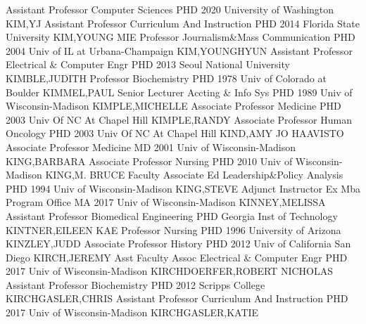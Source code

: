 \documentclass[
]{article}
\begin{document}
\textbar Assistant Professor \textbar Computer Sciences \textbar PHD
2020 University of Washington \textbar KIM,YJ \textbar{} 
\textbar Assistant Professor \textbar Curriculum And Instruction
\textbar PHD 2014 Florida State University \textbar KIM,YOUNG MIE
\textbar{}  \textbar Professor \textbar Journalism\&Mass
Communication \textbar PHD 2004 Univ of IL at Urbana-Champaign
\textbar KIM,YOUNGHYUN \textbar{}  \textbar Assistant
Professor \textbar Electrical \& Computer Engr \textbar PHD 2013 Seoul
National University \textbar KIMBLE,JUDITH \textbar{} 
\textbar Professor \textbar Biochemistry \textbar PHD 1978 Univ of
Colorado at Boulder \textbar KIMMEL,PAUL \textbar{} 
\textbar Senior Lecturer \textbar Accting \& Info Sys \textbar PHD 1989
Univ of Wisconsin-Madison \textbar KIMPLE,MICHELLE \textbar{}
 \textbar Associate Professor \textbar Medicine \textbar PHD
2003 Univ Of NC At Chapel Hill \textbar KIMPLE,RANDY \textbar{}
 \textbar Associate Professor \textbar Human Oncology
\textbar PHD 2003 Univ Of NC At Chapel Hill \textbar KIND,AMY JO
HAAVISTO \textbar{}  \textbar Associate Professor
\textbar Medicine \textbar MD 2001 Univ of Wisconsin-Madison
\textbar KING,BARBARA \textbar{}  \textbar Associate
Professor \textbar Nursing \textbar PHD 2010 Univ of Wisconsin-Madison
\textbar KING,M. BRUCE \textbar{}  \textbar Faculty
Associate \textbar Ed Leadership\&Policy Analysis \textbar PHD 1994 Univ
of Wisconsin-Madison \textbar KING,STEVE \textbar{} 
\textbar Adjunct Instructor \textbar Ex Mba Program Office \textbar MA
2017 Univ of Wisconsin-Madison \textbar KINNEY,MELISSA \textbar{}
 \textbar Assistant Professor \textbar Biomedical
Engineering \textbar PHD Georgia Inst of Technology
\textbar KINTNER,EILEEN KAE \textbar{}  \textbar Professor
\textbar Nursing \textbar PHD 1996 University of Arizona
\textbar KINZLEY,JUDD \textbar{}  \textbar Associate
Professor \textbar History \textbar PHD 2012 Univ of California San
Diego \textbar KIRCH,JEREMY \textbar{}  \textbar Asst
Faculty Assoc \textbar Electrical \& Computer Engr \textbar PHD 2017
Univ of Wisconsin-Madison \textbar KIRCHDOERFER,ROBERT NICHOLAS
\textbar{}  \textbar Assistant Professor
\textbar Biochemistry \textbar PHD 2012 Scripps College
\textbar KIRCHGASLER,CHRIS \textbar{}  \textbar Assistant
Professor \textbar Curriculum And Instruction \textbar PHD 2017 Univ of
Wisconsin-Madison \textbar KIRCHGASLER,KATIE \textbar{} 
\end{document}
